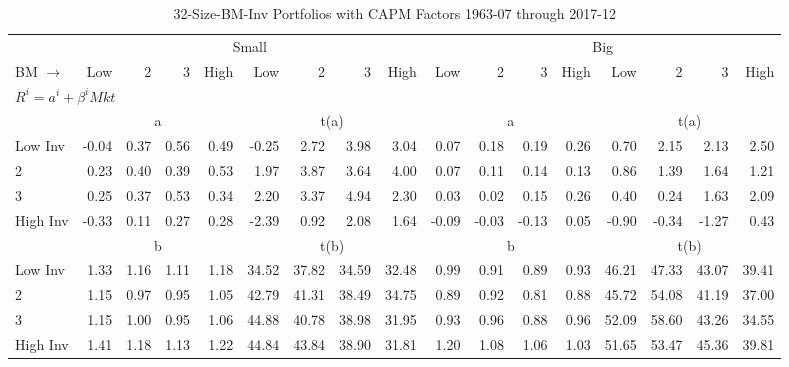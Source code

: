 
\begin{table}[!ht]
\footnotesize
\centering
\caption{32-Size-BM-Inv Portfolios with CAPM Factors 1963-07 through 2017-12}
\begin{tabular}{lrrrrrrrrrrrrrrrr}
  \toprule
    & \multicolumn{8}{c}{Small} & \multicolumn{8}{c}{Big} \\
      \cmidrule(r){2-9} \cmidrule(r){10-17}
    BM $\rightarrow$ & Low & 2 & 3 & High & Low & 2 & 3 & High & Low & 2 & 3 & High & Low & 2 & 3 & High \\ 
  \midrule
  \multicolumn{17}{l}{$R^i=a^i+\beta^iMkt$} \\

  
    
      & \multicolumn{4}{c}{a} & \multicolumn{4}{c}{t(a)}
    
      & \multicolumn{4}{c}{a} & \multicolumn{4}{c}{t(a)}
    
    \\
      \cmidrule(r){2-5} \cmidrule(r){6-9} \cmidrule(r){10-13} \cmidrule(r){14-17}

    Low Inv   & -0.04  & 0.37  & 0.56  & 0.49  & -0.25  & 2.72  & 3.98  & 3.04  & 0.07  & 0.18  & 0.19  & 0.26  & 0.70  & 2.15  & 2.13  & 2.50  \\
           2  & 0.23  & 0.40  & 0.39  & 0.53  & 1.97  & 3.87  & 3.64  & 4.00  & 0.07  & 0.11  & 0.14  & 0.13  & 0.86  & 1.39  & 1.64  & 1.21  \\
           3  & 0.25  & 0.37  & 0.53  & 0.34  & 2.20  & 3.37  & 4.94  & 2.30  & 0.03  & 0.02  & 0.15  & 0.26  & 0.40  & 0.24  & 1.63  & 2.09  \\
    High Inv  & -0.33  & 0.11  & 0.27  & 0.28  & -2.39  & 0.92  & 2.08  & 1.64  & -0.09  & -0.03  & -0.13  & 0.05  & -0.90  & -0.34  & -1.27  & 0.43  \\

  
    
      & \multicolumn{4}{c}{b} & \multicolumn{4}{c}{t(b)}
    
      & \multicolumn{4}{c}{b} & \multicolumn{4}{c}{t(b)}
    
    \\
      \cmidrule(r){2-5} \cmidrule(r){6-9} \cmidrule(r){10-13} \cmidrule(r){14-17}

    Low Inv   & 1.33  & 1.16  & 1.11  & 1.18  & 34.52  & 37.82  & 34.59  & 32.48  & 0.99  & 0.91  & 0.89  & 0.93  & 46.21  & 47.33  & 43.07  & 39.41  \\
           2  & 1.15  & 0.97  & 0.95  & 1.05  & 42.79  & 41.31  & 38.49  & 34.75  & 0.89  & 0.92  & 0.81  & 0.88  & 45.72  & 54.08  & 41.19  & 37.00  \\
           3  & 1.15  & 1.00  & 0.95  & 1.06  & 44.88  & 40.78  & 38.98  & 31.95  & 0.93  & 0.96  & 0.88  & 0.96  & 52.09  & 58.60  & 43.26  & 34.55  \\
    High Inv  & 1.41  & 1.18  & 1.13  & 1.22  & 44.84  & 43.84  & 38.90  & 31.81  & 1.20  & 1.08  & 1.06  & 1.03  & 51.65  & 53.47  & 45.36  & 39.81  \\

  

  \bottomrule
\end{tabular}
\label{tbl:32_Size_BM_Inv_CAPM}
\end{table}